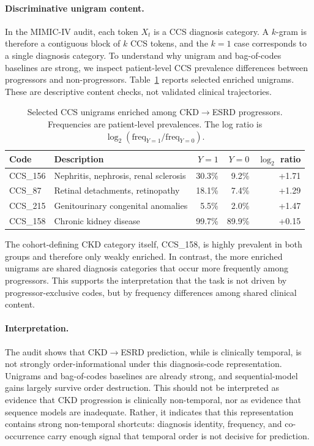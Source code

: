 \documentclass{article} %
\theoremstyle{plain}
\theoremstyle{definition}
\theoremstyle{remark}
\begin{document}
\paragraph{Discriminative unigram content.}
In the MIMIC-IV audit, each token $X_t$ is a CCS diagnosis category. A $k$-gram is therefore a contiguous block of $k$ CCS tokens, and the $k=1$ case corresponds to a single diagnosis category. To understand why unigram and bag-of-codes baselines are strong, we inspect patient-level CCS prevalence differences between progressors and non-progressors. Table~\ref{tab:mimic_ckd_discriminative_codes} reports selected enriched unigrams. These are descriptive content checks, not validated clinical trajectories.

\begin{table}[t]
\centering
\caption{Selected CCS unigrams enriched among CKD$\to$ESRD progressors. Frequencies are patient-level prevalences. The log ratio is $\log_2(\mathrm{freq}_{Y=1}/\mathrm{freq}_{Y=0})$.}
\label{tab:mimic_ckd_discriminative_codes}
\small
\begin{tabular}{l l r r r}
\toprule
Code & Description & $Y=1$ & $Y=0$ & $\log_2$ ratio \\
\midrule
CCS\_156 & Nephritis, nephrosis, renal sclerosis & 30.3\% & 9.2\% & +1.71 \\
CCS\_87 & Retinal detachments, retinopathy & 18.1\% & 7.4\% & +1.29 \\
CCS\_215 & Genitourinary congenital anomalies & 5.5\% & 2.0\% & +1.47 \\
\midrule
CCS\_158 & Chronic kidney disease & 99.7\% & 89.9\% & +0.15 \\
\bottomrule
\end{tabular}
\end{table}

The cohort-defining CKD category itself, CCS\_158, is highly prevalent in both groups and therefore only weakly enriched. In contrast, the more enriched unigrams are shared diagnosis categories that occur more frequently among progressors. This supports the interpretation that the task is not driven by progressor-exclusive codes, but by frequency differences among shared clinical content.

\paragraph{Interpretation.}
The audit shows that CKD$\to$ESRD prediction, while is clinically temporal, is not strongly order-informational under this diagnosis-code representation. Unigrams and bag-of-codes baselines are already strong, and sequential-model gains largely survive order destruction. This should not be interpreted as evidence that CKD progression is clinically non-temporal, nor as evidence that sequence models are inadequate. Rather, it indicates that this representation contains strong non-temporal shortcuts: diagnosis identity, frequency, and co-occurrence carry enough signal that temporal order is not decisive for prediction.
\end{document}
